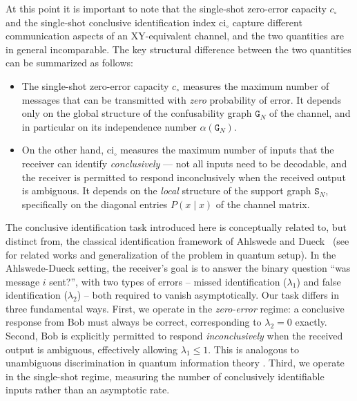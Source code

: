 \documentclass[12pt,a4paper]{article}
\begin{document}
\noindent At this point it is important to note that the single-shot zero-error capacity $c_\circ$ and the single-shot conclusive identification index $\mathrm{ci}_\circ$ capture different communication aspects of an XY-equivalent channel, and the two quantities are in general incomparable. The key structural difference between the two quantities can be summarized as follows:
\begin{itemize}[itemsep=-0.15cm, parsep=0.15cm, topsep=2pt, leftmargin=0.5cm]
\item The single-shot zero-error capacity $c_\circ$ measures the maximum number of messages that can be transmitted with \textit{zero} probability of error. It depends only on the global structure of the confusability graph $\mathtt{G}_N$ of the channel, and in particular on its independence number $\alpha(\mathtt{G}_N)$.
\item On the other hand, $\mathrm{ci}_\circ$ measures the maximum number of inputs that the receiver can identify \textit{conclusively} — not all inputs need to be decodable, and the receiver is permitted to respond inconclusively when the received output is ambiguous. It depends on the \textit{local} structure of the support graph $\mathtt{S}_N$, specifically on the diagonal entries $P(x \mid x)$ of the channel matrix.
\end{itemize}

\noindent The conclusive identification task introduced here is conceptually related to, but distinct from, the classical identification framework of Ahlswede and Dueck~\cite{Ahlswede1989-1} (see \cite{Ahlswede1989-2,Ahlswede2002,Winter2013,Colomer2025} for related works and generalization of the problem in quantum setup). In the Ahlswede-Dueck setting, the receiver's goal is to answer the binary question ``was message $i$ sent?'',  with two types of errors -- missed identification ($\lambda_1$) and false identification ($\lambda_2$) -- both required to vanish asymptotically. Our task differs in three fundamental ways. First, we operate in the \textit{zero-error} regime: a conclusive response from Bob must always be correct, corresponding to $\lambda_2 = 0$ exactly. Second, Bob is explicitly permitted to respond \textit{inconclusively} when the received output is ambiguous, effectively allowing $\lambda_1 \leq 1$. This is analogous to unambiguous discrimination in quantum information theory \cite{Chefles2000,Barnett2009,Bae2015}. Third, we operate in the single-shot regime, measuring the number of conclusively identifiable inputs rather than an asymptotic rate.
\end{document}
